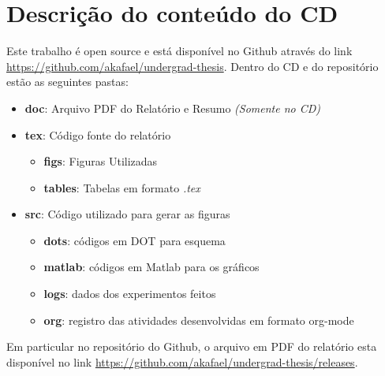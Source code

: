 \chapter{Descrição do conteúdo do CD}

\label{AnCD}

Este trabalho é open source e está disponível no Github através do link \url{https://github.com/akafael/undergrad-thesis}. Dentro do CD e do repositório estão as seguintes pastas:

\begin{itemize}
    \item \textbf{doc}: Arquivo PDF do Relatório e Resumo \textit{(Somente no CD)}
    \item \textbf{tex}: Código fonte do relatório
    \begin{itemize}
        \item \textbf{figs}: Figuras Utilizadas
        \item \textbf{tables}: Tabelas em formato \textit{.tex}
    \end{itemize}
    \item \textbf{src}: Código utilizado para gerar as figuras
    \begin{itemize}
        \item \textbf{dots}: códigos em DOT para esquema
        \item \textbf{matlab}: códigos em Matlab para os gráficos
        \item \textbf{logs}: dados dos experimentos feitos
        \item \textbf{org}: registro das atividades desenvolvidas em formato org-mode
        \end{itemize}
\end{itemize}

Em particular no repositório do Github, o arquivo em PDF do relatório esta disponível no link \url{https://github.com/akafael/undergrad-thesis/releases}.

